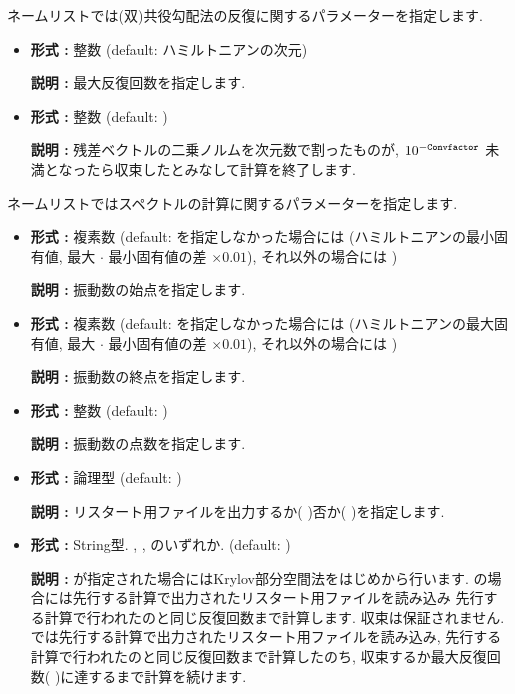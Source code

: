 \documentclass[letterpaper,10pt,dvipdfmx,openany]{sphinxmanual}
\begin{document}
ネームリストでは(双)共役勾配法の反復に関するパラメーターを指定します.
\begin{itemize}
\item {} 

\textbf{形式 :} 整数 (default: ハミルトニアンの次元)

\textbf{説明 :} 最大反復回数を指定します.

\item {} 

\textbf{形式 :} 整数 (default: )

\textbf{説明 :} 残差ベクトルの二乗ノルムを次元数で割ったものが,
\(10^{-{\tt Convfactor}}\) 未満となったら収束したとみなして計算を終了します.

\end{itemize}

 ネームリストではスペクトルの計算に関するパラメーターを指定します.
\begin{itemize}
\item {} 

\textbf{形式 :} 複素数 (default:  を指定しなかった場合には
(ハミルトニアンの最小固有値,
最大 \(\cdot\) 最小固有値の差 \(\times0.01\)),
それ以外の場合には )

\textbf{説明 :} 振動数の始点を指定します.

\item {} 

\textbf{形式 :} 複素数 (default:  を指定しなかった場合には
(ハミルトニアンの最大固有値,
最大 \(\cdot\) 最小固有値の差 \(\times0.01\)),
それ以外の場合には )

\textbf{説明 :} 振動数の終点を指定します.

\item {} 

\textbf{形式 :} 整数 (default: )

\textbf{説明 :} 振動数の点数を指定します.

\item {} 

\textbf{形式 :} 論理型 (default: )

\textbf{説明 :}
リスタート用ファイルを出力するか( )否か( )を指定します.

\item {} 

\textbf{形式 :}
String型.  , ,  のいずれか.
(default: )

\textbf{説明 :}
 が指定された場合にはKrylov部分空間法をはじめから行います.
 の場合には先行する計算で出力されたリスタート用ファイルを読み込み
先行する計算で行われたのと同じ反復回数まで計算します. 収束は保証されません.
 では先行する計算で出力されたリスタート用ファイルを読み込み,
先行する計算で行われたのと同じ反復回数まで計算したのち,
収束するか最大反復回数( )に達するまで計算を続けます.

\end{itemize}
\end{document}
